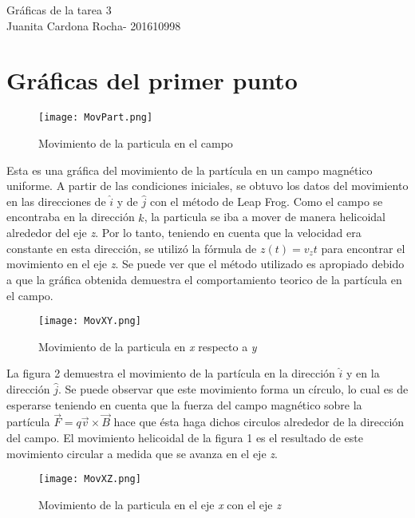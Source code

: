 \documentclass[11pt,letterpaper]{exam}
\begin{document}
\begin{center}
{\Large Gráficas de la tarea 3 } \\
Juanita Cardona Rocha- \textsc{201610998}\\
\end{center}


\noindent
\section{Gráficas del primer punto}
\begin{figure}[H]
	\centering
	\texttt{[image: MovPart.png]}
	\caption{Movimiento de la particula en el campo}
\end{figure}

Esta es una gráfica del movimiento de la partícula en un campo magnético uniforme. A partir de las condiciones iniciales, se obtuvo los datos del movimiento en las direcciones de $\hat{i}$ y de $\hat{j}$ con el método de Leap Frog. Como el campo se encontraba en la dirección $\hat{k}$, la particula se iba a mover de manera helicoidal alrededor del eje \textit{z}. Por lo tanto, teniendo en cuenta que la velocidad era constante en esta dirección, se utilizó la fórmula de $z(t) = v_{z}t$ para encontrar el movimiento en el eje \textit{z}. Se puede ver que el método utilizado es apropiado debido a que la gráfica obtenida demuestra el comportamiento teorico de la partícula en el campo.\\

\begin{figure}[H]
	\centering
	\texttt{[image: MovXY.png]}
	\caption{Movimiento de la particula en \textit{x} respecto a \textit{y}}
\end{figure}

La figura 2 demuestra el movimiento de la partícula en la dirección $\hat{i}$ y en la dirección $\hat{j}$. Se puede observar que este movimiento forma un círculo, lo cual es de esperarse teniendo en cuenta que la fuerza del campo magnético sobre la partícula $\vec{F} = q\vec{v}\times \vec{B}$ hace que ésta haga dichos circulos alrededor de la dirección del campo. El movimiento helicoidal de la figura 1 es el resultado de este movimiento circular a medida que se avanza en el eje \textit{z}.\\

\begin{figure}[H]
	\centering
	\texttt{[image: MovXZ.png]}
	\caption{Movimiento de la particula en el eje \textit{x} con el eje \textit{z}}
\end{figure}
\end{document}
